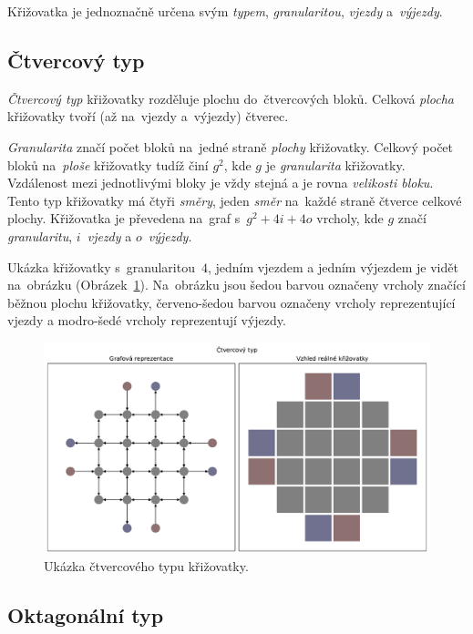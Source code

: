 Křižovatka je jednoznačně určena svým \emph{typem}, \emph{granularitou}, \emph{vjezdy} a~\emph{výjezdy}.

\subsection{Čtvercový typ}\label{subsec:ctvercovy-typ}

\emph{Čtvercový typ} křižovatky rozděluje plochu do~čtvercových bloků.
Celková \emph{plocha} křižovatky tvoří (až na~vjezdy a~výjezdy) čtverec.

\emph{Granularita} značí počet bloků na~jedné straně \emph{plochy} křižovatky.
Celkový počet bloků na~\emph{ploše} křižovatky tudíž činí $g^2$, kde $g$ je \emph{granularita} křižovatky.
Vzdálenost mezi jednotlivými bloky je vždy stejná a je rovna \emph{velikosti bloku}.
Tento typ křižovatky má čtyři \emph{směry}, jeden \emph{směr} na~každé straně čtverce celkové plochy.
Křižovatka je převedena na~graf s~$g^2 + 4i + 4o$ vrcholy, kde $g$ značí \emph{granularitu}, $i$~\emph{vjezdy} a $o$~\emph{výjezdy}.

Ukázka křižovatky s~granularitou~$4$, jedním vjezdem a jedním výjezdem je vidět na~obrázku (Obrázek~\ref{fig:square_type_graph}).
Na~obrázku jsou šedou barvou označeny vrcholy značící běžnou plochu křižovatky,
červeno-šedou barvou označeny vrcholy reprezentující vjezdy a modro-šedé vrcholy reprezentují výjezdy.

\begin{figure}[h]
	\centering
	\includegraphics[width=\textwidth]{../img/Square_grid}
	\caption{Ukázka čtvercového typu křižovatky.}
	\label{fig:square_type_graph}
\end{figure}

\subsection{Oktagonální typ}\label{subsec:octagonalni-typ}

